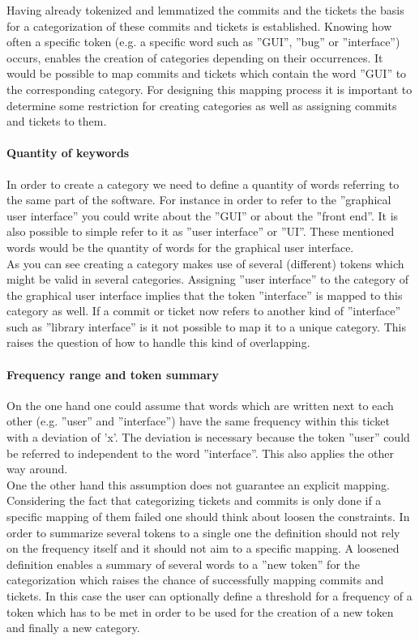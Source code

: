 Having already tokenized and lemmatized the commits and the tickets the basis for a categorization of these commits and tickets is established.
Knowing how often a specific token (e.g. a specific word such as ''GUI'', ''bug'' or ''interface'') occurs, enables the creation of categories  depending on their occurrences.
It would be possible to map commits and tickets which contain the word ''GUI'' to the corresponding category.
For designing this mapping process it is important to determine some restriction for creating categories as well as assigning commits and tickets to them. 

\paragraph{Quantity of keywords}

In order to create a category we need to define a quantity of words referring to the same part of the software.
For instance in order to refer to the ''graphical user interface'' you could write about the ''GUI'' or about the ''front end''.
It is also possible to simple refer to it as ''user interface'' or ''UI''.
These mentioned words would be the quantity of words for the graphical user interface. \\
As you can see creating a category makes use of several (different) tokens which might be valid in several categories.
Assigning ''user interface'' to the category of the graphical user interface implies that the token ''interface'' is mapped to this category as well.
If a commit or ticket now refers to another kind of ''interface'' such as ''library interface'' is it not possible to map it to a unique category.
This raises the question of how to handle this kind of overlapping. 

\paragraph{Frequency range and token summary}

On the one hand one could assume that words which are written next to each other (e.g. ''user'' and  ''interface'') have the same frequency within this ticket with a deviation of 'x'.
The deviation is necessary because the token ''user'' could be referred to independent to the word ''interface''.
This also applies the other way around. \\
One the other hand this assumption does not guarantee an explicit mapping.
Considering the fact that categorizing tickets and commits is only done if a specific mapping of them failed one should think about loosen the constraints.
In order to summarize several tokens to a single one the definition should not rely on the frequency itself and it should not aim to a specific mapping.
A loosened definition enables a summary of several words to a ''new token'' for the categorization which raises the chance of successfully mapping commits and tickets.
In this case the user can optionally define a threshold for a frequency of a token which has to be met in order to be used for the creation of a new token and finally a new category.


